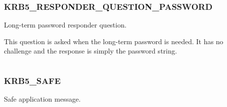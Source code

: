 \documentclass[letterpaper,10pt,english]{sphinxmanual}
\begin{document}
\subsubsection{KRB5\_RESPONDER\_QUESTION\_PASSWORD}
\label{appdev/refs/macros/KRB5_RESPONDER_QUESTION_PASSWORD:krb5-responder-question-password-data}\label{appdev/refs/macros/KRB5_RESPONDER_QUESTION_PASSWORD:krb5-responder-question-password}\label{appdev/refs/macros/KRB5_RESPONDER_QUESTION_PASSWORD::doc}

\begin{fulllineitems}
\label{appdev/refs/macros/KRB5_RESPONDER_QUESTION_PASSWORD:KRB5_RESPONDER_QUESTION_PASSWORD}
\end{fulllineitems}


Long-term password responder question.

This question is asked when the long-term password is needed. It has no challenge and the response is simply the password string.

\begin{tabulary}{\linewidth}{|L|L|}
\hline

 & 
\\
\hline\end{tabulary}



\subsubsection{KRB5\_SAFE}
\label{appdev/refs/macros/KRB5_SAFE:krb5-safe}\label{appdev/refs/macros/KRB5_SAFE::doc}\label{appdev/refs/macros/KRB5_SAFE:krb5-safe-data}

\begin{fulllineitems}
\label{appdev/refs/macros/KRB5_SAFE:KRB5_SAFE}
\end{fulllineitems}


Safe application message.

\begin{tabulary}{\linewidth}{|L|L|}
\hline

 & 
\\
\hline\end{tabulary}
\end{document}
